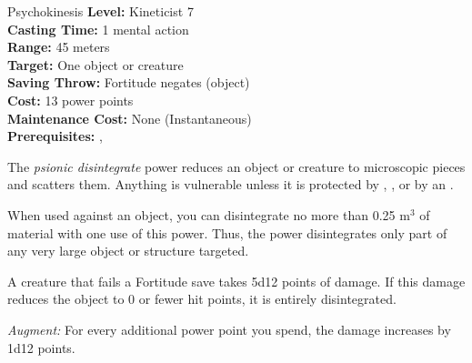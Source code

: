 {Psychokinesis}
{
	\textbf{Level:}
	Kineticist 7\\
	\textbf{Casting Time:}
	1 mental action\\
	\textbf{Range:}
	45 meters\\
	\textbf{Target:}
	One object or creature\\
	\textbf{Saving Throw:}
	Fortitude negates (object)\\
	\textbf{Cost:}
	13 power points\\
	\textbf{Maintenance Cost:}
	None (Instantaneous)\\
	\textbf{Prerequisites:}
	, \\
}
{
	The \emph{psionic disintegrate} power reduces an object or creature to microscopic pieces and scatters them. Anything is vulnerable unless it is protected by , , or by an .

	When used against an object, you can disintegrate no more than 0.25 m$^3$ of material with one use of this power. Thus, the power disintegrates only part of any very large object or structure targeted.

	A creature that fails a Fortitude save takes 5d12 points of damage. If this damage reduces the object to 0 or fewer hit points, it is entirely disintegrated.

	\emph{Augment:} For every additional power point you spend, the damage increases by 1d12 points.
}